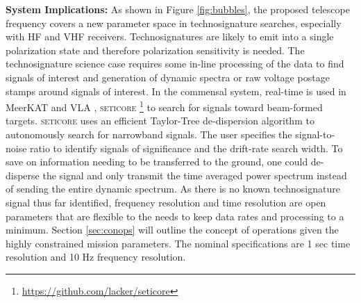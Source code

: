 

\textbf{System Implications:} As shown in Figure \ref{fig:bubbles}, the proposed telescope frequency covers a new parameter space in technosignature searches, especially with HF and VHF receivers. Technosignatures are likely to emit into a single polarization state and therefore polarization sensitivity is needed. The technosignature science case requires some in-line processing of the data to find signals of interest and generation of dynamic spectra or raw voltage postage stamps around signals of interest. In the commensal system, real-time is used in MeerKAT \citep{Czech_2021} and VLA \citep{Tremblay_2024}, \textsc{seticore} \footnote{\url{https://github.com/lacker/seticore}} to search for signals toward beam-formed targets. \textsc{seticore} uses an efficient Taylor-Tree de-dispersion algorithm to autonomously search for narrowband signals. The user specifies the signal-to-noise ratio to identify signals of significance and the drift-rate search width. To save on information needing to be transferred to the ground, one could de-disperse the signal and only transmit the time averaged power spectrum instead of sending the entire dynamic spectrum. As there is no known technosignature signal thus far identified, frequency resolution and time resolution are open parameters that are flexible to the needs to keep data rates and processing to a minimum.  Section \ref{sec:conops} will outline the concept of operations given the highly constrained mission parameters.  The nominal specifications are 1 sec time resolution and 10 Hz frequency resolution.

